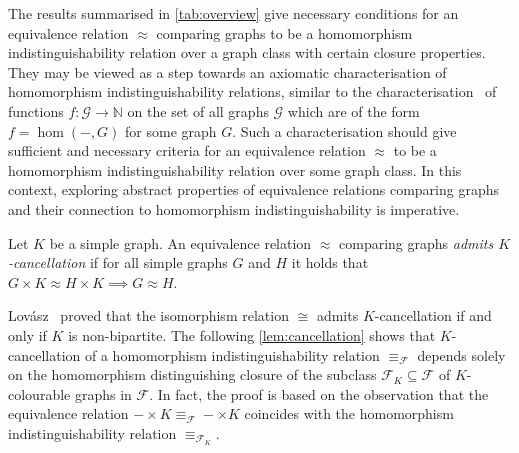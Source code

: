 \documentclass[3p,final]{elsarticle}
\begin{document}
	The results summarised in \cref{tab:overview} give necessary conditions for an equivalence relation $\approx$ comparing graphs to be a homomorphism indistinguishability relation over a graph class with certain closure properties.
	They may be viewed as a step towards an axiomatic characterisation of homomorphism indistinguishability relations, similar to the characterisation~\cite{freedman_reflection_2007,lovasz_semidefinite_2009} of functions $f \colon \mathcal{G} \to \mathbb{N}$ on the set of all graphs $\mathcal{G}$ which are of the form $f = \hom(-, G)$ for some graph $G$.
	Such a characterisation should give sufficient and necessary criteria for an equivalence relation $\approx$ to be a homomorphism indistinguishability relation over some graph class.
	In this context, exploring abstract properties of equivalence relations comparing graphs and their connection to homomorphism indistinguishability is imperative.
	
	\begin{definition}
	Let $K$ be a simple graph. An equivalence relation $\approx$ comparing graphs \emph{admits $K$-cancellation} if for all simple graphs $G$ and $H$ it holds that
	\(
	G \times K \approx H \times K \implies G \approx H.
	\)
	\end{definition}
	Lovász~\cite{lovasz_cancellation_1971} proved that the isomorphism relation $\cong$ admits $K$-cancellation if and only if $K$ is non-bipartite.
	The following \cref{lem:cancellation} shows that $K$-cancellation of a homomorphism indistinguishability relation $\equiv_{\mathcal{F}}$ depends solely on the homomorphism distinguishing closure of the subclass $\mathcal{F}_K \subseteq \mathcal{F}$ of $K$-colourable graphs in $\mathcal{F}$.
	In fact, the proof is based on the observation that the equivalence relation $- \times K \equiv_{\mathcal{F}} - \times K$ coincides with the homomorphism indistinguishability relation $\equiv_{\mathcal{F}_K}$.
	
\end{document}
